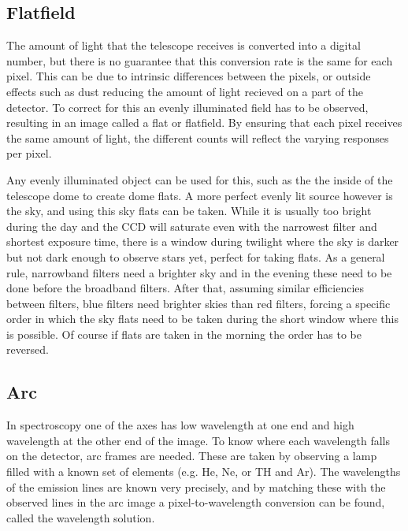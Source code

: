 \documentclass[a4paper,oneside,12pt, class=Latex/Classes/PhDthesisPSnPDF, crop=false]{standalone}
\begin{document}
\subsection{Flatfield}
The amount of light that the telescope receives is converted into a digital number, but there is no guarantee that this conversion rate is the same for each pixel. This can be due to intrinsic differences between the pixels, or outside effects such as dust reducing the amount of light recieved on a part of the detector. To correct for this an evenly illuminated field has to be observed, resulting in an image called a flat or flatfield. By ensuring that each pixel receives the same amount of light, the different counts will reflect the varying responses per pixel.

Any evenly illuminated object can be used for this, such as the the inside of the telescope dome to create dome flats. A more perfect evenly lit source however is the sky, and using this sky flats can be taken. While it is usually too bright during the day and the CCD will saturate even with the narrowest filter and shortest exposure time, there is a window during twilight where the sky is darker but not dark enough to observe stars yet, perfect for taking flats. As a general rule, narrowband filters need a brighter sky and in the evening these need to be done before the broadband filters. After that, assuming similar efficiencies between filters, blue filters need brighter skies than red filters, forcing a specific order in which the sky flats need to be taken during the short window where this is possible. Of course if flats are taken in the morning the order has to be reversed.


\subsection{Arc}
In spectroscopy one of the axes has low wavelength at one end and high wavelength at the other end of the image. To know where each wavelength falls on the detector, arc frames are needed. These are taken by observing a lamp filled with a known set of elements (e.g. He, Ne, or TH and Ar). The wavelengths of the emission lines are known very precisely, and by matching these with the observed lines in the arc image a pixel-to-wavelength conversion can be found, called the wavelength solution.
\end{document}
